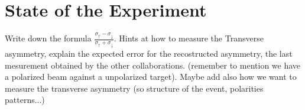 \section{State of the Experiment}

Write down the formula $\frac{\sigma_{\uparrow} - \sigma_{\downarrow}}{\sigma_{\uparrow} + \sigma_{\downarrow}}$. Hints at how to measure the Transverse asymmetry, explain the expected error for the recostructed asymmetry, the last mesurement obtained by the other collaborations. (remember to mention we have a polarized beam against a unpolarized target). Maybe add also how we want to measure the transverse asymmetry (so structure of the event, polarities patterns...)



